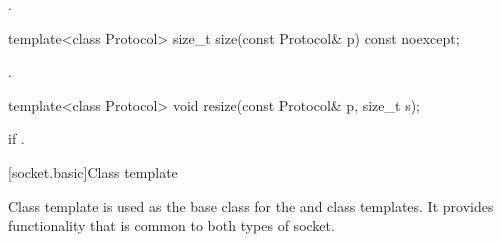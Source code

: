 \begin{itemdescr}
\pnum
\returns {}.
\end{itemdescr}

\begin{itemdecl}
template<class Protocol> size_t size(const Protocol& p) const noexcept;
\end{itemdecl}

\begin{itemdescr}
\pnum
\returns {}.
\end{itemdescr}

\begin{itemdecl}
template<class Protocol> void resize(const Protocol& p, size_t s);
\end{itemdecl}

\begin{itemdescr}
\pnum
\remarks {} if .
\end{itemdescr}




[socket.basic]{Class template }

\pnum
Class template  is used as the base class for the  and  class templates. It provides functionality that is common to both types of socket.

